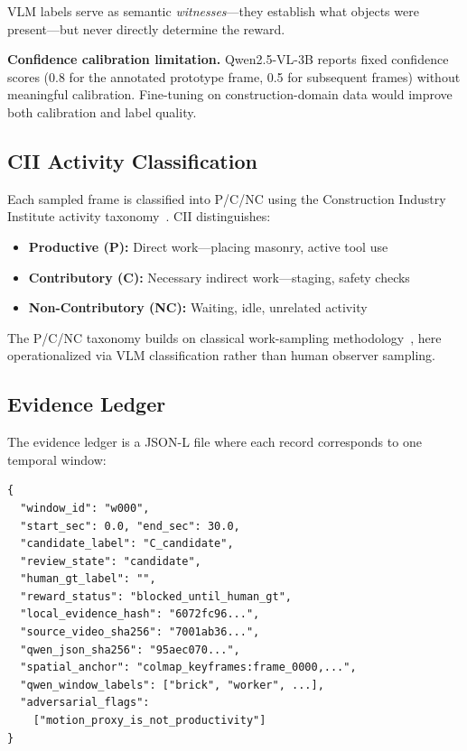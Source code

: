 \documentclass[sigconf,nonacm]{acmart}
\begin{document}
VLM labels serve as semantic \emph{witnesses}---they establish what objects were present---but never directly determine the reward.

\textbf{Confidence calibration limitation.}
Qwen2.5-VL-3B reports fixed confidence scores (0.8 for the annotated prototype frame, 0.5 for subsequent frames) without meaningful calibration.
Fine-tuning on construction-domain data would improve both calibration and label quality.

\subsection{CII Activity Classification}

Each sampled frame is classified into P/C/NC using the Construction Industry Institute activity taxonomy~\cite{cii252}.
CII distinguishes:
\begin{itemize}[leftmargin=1.4em,itemsep=0.1em]
\item \textbf{Productive (P):} Direct work---placing masonry, active tool use
\item \textbf{Contributory (C):} Necessary indirect work---staging, safety checks
\item \textbf{Non-Contributory (NC):} Waiting, idle, unrelated activity
\end{itemize}

The P/C/NC taxonomy builds on classical work-sampling methodology~\cite{cii252}, here operationalized via VLM classification rather than human observer sampling.

\subsection{Evidence Ledger}

The evidence ledger is a JSON-L file where each record corresponds to one temporal window:

\begin{lstlisting}[language={}]
{
  "window_id": "w000",
  "start_sec": 0.0, "end_sec": 30.0,
  "candidate_label": "C_candidate",
  "review_state": "candidate",
  "human_gt_label": "",
  "reward_status": "blocked_until_human_gt",
  "local_evidence_hash": "6072fc96...",
  "source_video_sha256": "7001ab36...",
  "qwen_json_sha256": "95aec070...",
  "spatial_anchor": "colmap_keyframes:frame_0000,...",
  "qwen_window_labels": ["brick", "worker", ...],
  "adversarial_flags":
    ["motion_proxy_is_not_productivity"]
}
\end{lstlisting}
\end{document}
